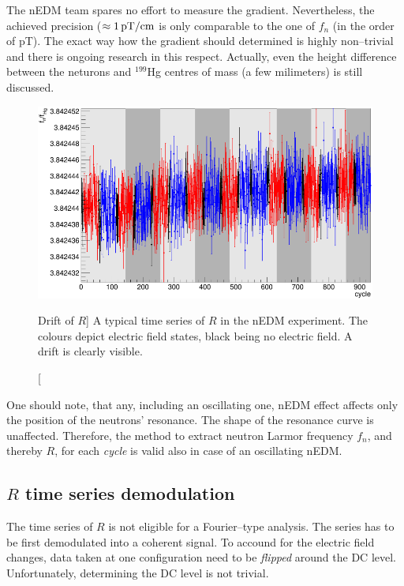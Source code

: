 The nEDM team spares no effort to measure the gradient. Nevertheless, the achieved precision ($\approx \unit[1]{pT/cm}$ is only comparable to the one of $f_n$ (in the order of \unit[1]{pT}). The exact way how the gradient should determined is highly non--trivial and there is ongoing research in this respect. Actually, even the height difference between the neturons and $^{199}$Hg centres of mass (a few milimeters) is still discussed. %

\begin{figure}[bth]
  \myfloatalign
  \includegraphics[width=.8\linewidth]{gfx/axions/gradient_drift_yoann}
  \caption
  [Drift of $R$]
  {%
A typical time series of $R$ in the nEDM experiment. The colours depict electric field states, black being no electric field. A drift is clearly visible.}
  \label{fig:axions_gradient_drift}
\end{figure}

One should note, that any, including an oscillating one, nEDM effect affects only the position of the neutrons' resonance. The shape of the resonance curve is unaffected. Therefore, the method to extract neutron Larmor frequency $f_n$, and thereby $R$, for each \emph{cycle} is valid also in case of an oscillating nEDM.


\subsection{$R$ time series demodulation}
The time series of $R$ is not eligible for a Fourier--type analysis. The series has to be first demodulated into a coherent signal. To accound for the electric field changes, data taken at one configuration need to be \emph{flipped} around the DC level. Unfortunately, determining the DC level is not trivial.

